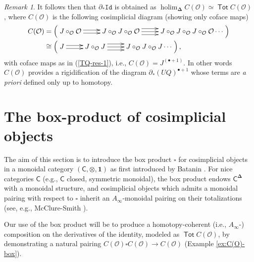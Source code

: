 \documentclass[11pt]{amsart}
\theoremstyle{definition}
\theoremstyle{remark}
\newtheorem{remark}[subsection]{Remark}
\newcommand{\Tot}{\operatorname{\mathsf{Tot}}}
\newcommand{\holim}{\operatorname{holim}}
\newcommand{\Id}{\mathtt{Id}}
\newcommand{\Cal}[1]{\mathcal{#1}}
\newcommand{\bdel}{\mathbf{\Delta}}
\begin{document}
\begin{remark} \label{prop:der_n-model-equivs} It follows then that $\partial_* \Id$ is obtained as $\holim_{\bdel} C(\Cal{O})\simeq \Tot C(\Cal{O})$, where $C(\Cal{O})$ is the following cosimplicial diagram (showing only coface maps)\begin{align} \label{al:CO}
    C(\Cal{O}) &= \left( \xymatrix{
    J\circ_{\Cal{O}} \Cal{O} \ar@<-.5ex>[r] \ar@<.5ex>[r] &
    J\circ_{\Cal{O}} J\circ_{\Cal{O}}\Cal{O} \ar@<-1ex>[r] \ar[r] \ar@<1ex>[r] & 
    J\circ_{\Cal{O}} J\circ_{\Cal{O}} J\circ_{\Cal{O}}\Cal{O} \cdots
    }\right) 
    \\
    & \cong \left( \xymatrix{
    J \ar@<-.5ex>[r] \ar@<.5ex>[r] &
    J\circ_{\Cal{O}} J \ar@<-1ex>[r] \ar[r] \ar@<1ex>[r] & 
    J\circ_{\Cal{O}} J\circ_{\Cal{O}} J\cdots
    }\right), \nonumber
\end{align}
with coface maps as in (\ref{TQ-res-1}), i.e., $C(\Cal{O})= J^{(\bullet+1)}$. In other words $C(\Cal{O})$ provides a rigidification of the diagram $\partial_* (UQ)^{\bullet+1}$ whose terms are \textit{a priori} defined only up to homotopy.
\end{remark} 

\section{The box-product of cosimplicial objects}
The aim of this section is to introduce the box product $\square$ for cosimplicial objects in a monoidal category $(\mathsf{C}, \otimes, \mathbf{1})$ as first introduced by Batanin \cite{Bat-box}. For nice categories $\mathsf{C}$ (e.g.,  $\mathsf{C}$ closed, symmetric monoidal), the box product endows $\mathsf{C}^{\bdel}$ with a monoidal structure, and cosimplicial objects which admits a monoidal pairing with respect to $\square$ inherit an $A_{\infty}$-monoidal pairing on their totalizations (see, e.g.,  McClure-Smith \cite[3.1]{MS-box}).

Our use of the box product will be to produce a homotopy-coherent (i.e., $A_{\infty}$-) composition on the derivatives of the identity, modeled as $\Tot C(\Cal{O})$, by demonstrating a natural pairing $C(\Cal{O})\square C(\Cal{O})\to C(\Cal{O})$ (Example \ref{ex:C(O)-box}).
\end{document}

